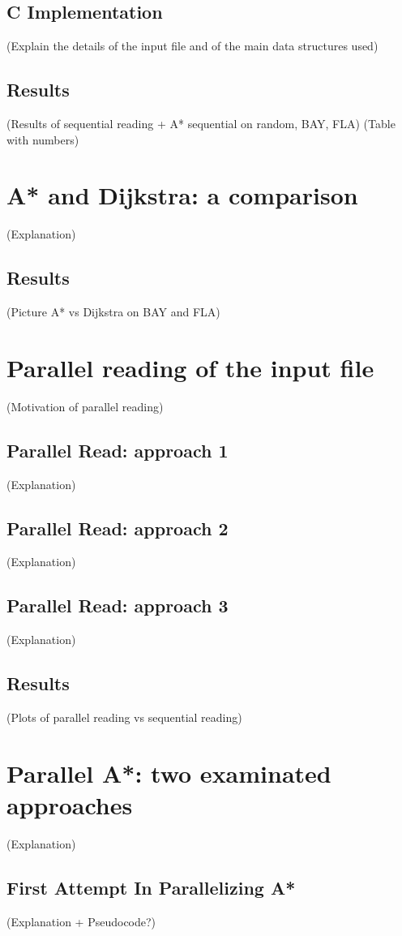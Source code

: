 \documentclass[twocolumn, switch]{article} %
\begin{document}
\subsection{C Implementation}
(Explain the details of the input file and of the main data structures used)

\subsection{Results}
(Results of sequential reading + A* sequential on random, BAY, FLA)
(Table with numbers)

\section{A* and Dijkstra: a comparison}
(Explanation)

\subsection{Results}
(Picture A* vs Dijkstra on BAY and FLA)

\section{Parallel reading of the input file}
(Motivation of parallel reading)
\subsection{Parallel Read: approach 1}
(Explanation)
\subsection{Parallel Read: approach 2}
(Explanation)
\subsection{Parallel Read: approach 3}
(Explanation)
\subsection{Results}
(Plots of parallel reading vs sequential reading)

\section{Parallel A*: two examinated approaches}
(Explanation)
\subsection{First Attempt In Parallelizing A*}
(Explanation + Pseudocode?)
\end{document}
